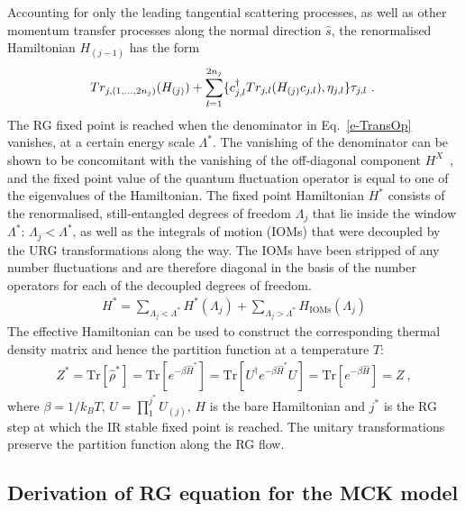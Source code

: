 \documentclass[12pt]{iopart}
\begin{document}
Accounting for only the leading tangential scattering processes, as well as other momentum transfer processes along the normal direction $\hat{s}$, the renormalised Hamiltonian \(H_{(j-1)}\) has the form~\cite{anirbanurg1}
\begin{eqnarray}
\hspace*{-0.1cm}Tr_{j,(1,\ldots,2n_{j})}(H_{(j)})+\sum_{l=1}^{2n_{j}}\lbrace c^{\dagger}_{j,l}Tr_{j,l}(H_{(j)}c_{j,l}),\eta_{j,l}\rbrace\tau_{j,l}~.\label{HRG}
\end{eqnarray}
The RG fixed point is reached when the denominator in Eq.~\ref{e-TransOp} vanishes, at a certain energy scale \(\Lambda^*\). The vanishing of the denominator can be shown to be concomitant with the vanishing of the off-diagonal component \(H^X\)~\cite{anirbanurg1}, and the fixed point value of the quantum fluctuation operator is equal to one of the eigenvalues of the Hamiltonian. The fixed point Hamiltonian \(H^*\) consists of the renormalised, still-entangled degrees of freedom \(\Lambda_j\) that lie inside the window \(\Lambda^*\): \(\Lambda_j < \Lambda^*\), as well as the integrals of motion (IOMs) that were decoupled by the URG transformations along the way. The IOMs have been stripped of any number fluctuations and are therefore diagonal in the basis of the number operators for each of the decoupled degrees of freedom.
\begin{eqnarray}
	H^* = \sum_{\Lambda_j < \Lambda^*} H^*(\Lambda_j) + \sum_{\Lambda_j > \Lambda^*}H_\text{IOMs}(\Lambda_j)
\end{eqnarray}
The effective Hamiltonian can be used to construct the corresponding thermal density matrix and hence the partition function at a temperature \(T\):
\begin{eqnarray}
Z^* = \mathrm{Tr}\left[ \hat{\rho}^*\right] = \mathrm{Tr}\left[ e^{-\beta \hat{H}^{*}}\right] = \mathrm{Tr}\left[ U^{\dagger} e^{-\beta \hat{H}^{*}} U\right] = \mathrm{Tr}\left[ e^{-\beta \hat{H}}\right] = Z
\label{partfunc}~,
\end{eqnarray}
where \(\beta = 1/k_B T\), \(U = \prod_{1}^{j^{*}}U_{(j)}\), $H$ is the bare Hamiltonian and $j^{*}$ is the RG step at which the IR stable fixed point is reached. The unitary transformations preserve the partition function along the RG flow.

\subsection{Derivation of RG equation for the MCK model}
\end{document}

